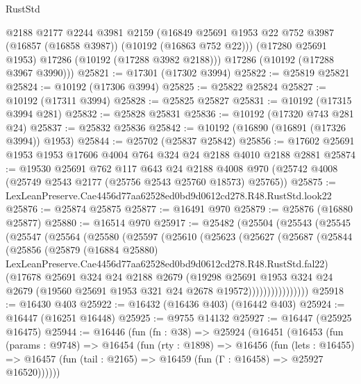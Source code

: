 \begin{lexlean}{RustStd}
\begin{coremodule}
        @2188
        @2177
        @2244
        @3981
        @2159
        (@16849 @25691 @1953 @22 @752 @3987 (@16857 (@16858 @3987)) (@10192 (@16863 @752 @22)))
        (@17280 @25691 @1953)
        @17286
        (@10192 (@17288 @3982 @2188)))
      @17286
      (@10192 (@17288 @3967 @3990)))
@25821 := @17301 (@17302 @3994)
@25822 := @25819 @25821
@25824 := @10192 (@17306 @3994)
@25825 := @25822 @25824
@25827 := @10192 (@17311 @3994)
@25828 := @25825 @25827
@25831 := @10192 (@17315 @3994 @281)
@25832 := @25828 @25831
@25836 := @10192 (@17320 @743 @281 @24)
@25837 := @25832 @25836
@25842 := @10192 (@16890 (@16891 (@17326 @3994)) @1953)
@25844 := @25702 (@25837 @25842)
@25856 := @17602 @25691 @1953 @1953 @17606 @4004 @764 @324 @24 @2188 @4010 @2188 @2881
@25874 := @19530
    @25691
    @762
    @117
    @643
    @24
    @2188
    @4008
    @970
    (@25742 @4008 (@25749 @2543 @2177 (@25756 @2543 @25760 @18573) @25765))
@25875 := LexLeanPreserve.Cae4456d77aa62528ed0bd9d0612cd278.R48.RustStd.look22
@25876 := @25874 @25875
@25877 := @16491 @970
@25879 := @25876 (@16880 @25877)
@25880 := @16514 @970
@25917 := @25482
    (@25504
      (@25543
        (@25545
          (@25547
            (@25564
              (@25580
                (@25597
                  (@25610
                    (@25623
                      (@25627
                        (@25687
                          (@25844
                            (@25856
                              (@25879
                                (@16884 @25880)
                                LexLeanPreserve.Cae4456d77aa62528ed0bd9d0612cd278.R48.RustStd.fal22)
                              (@17678
                                @25691
                                @324
                                @24
                                @2188
                                @2679
                                (@19298
                                  @25691
                                  @1953
                                  @324
                                  @24
                                  @2679
                                  (@19560 @25691 @1953 @321 @24 @2678 @19572))))))))))))))))
@25918 := @16430 @403
@25922 := @16432 (@16436 @403) (@16442 @403)
@25924 := @16447 (@16251 @16448)
@25925 := @9755 @14132
@25927 := @16447 (@25925 @16475)
@25944 := @16446
    (fun (fn : @38) =>
    @25924
      (@16451
        (@16453
          (fun (params : @9748) =>
          @16454
            (fun (rty : @1898) =>
            @16456
              (fun (lets : @16455) =>
              @16457 (fun (tail : @2165) => @16459 (fun (Γ : @16458) => @25927 @16520))))))

\end{coremodule}
\end{lexlean}
